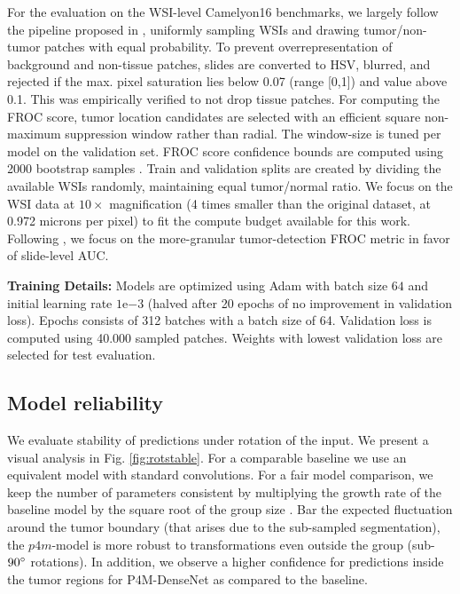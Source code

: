 \documentclass{llncs}
\newcommand{\citet}[1]{\cite{#1}}
\begin{document}
For the evaluation on the WSI-level Camelyon16 benchmarks, we largely follow the pipeline proposed in \citet{Liu2017-jq}, uniformly sampling WSIs and drawing tumor/non-tumor patches with equal probability. To prevent overrepresentation of background  and non-tissue patches, slides are converted to HSV, blurred, and rejected if the max. pixel saturation lies below 0.07 (range [0,1]) and value above 0.1. This was empirically verified to not drop tissue patches. For computing the FROC score, tumor location candidates are selected with an efficient square non-maximum suppression window rather than radial. The window-size is tuned per model on the validation set. FROC score confidence bounds are computed using 2000 bootstrap samples \citet{Liu2017-jq}. Train and validation splits are created by dividing the available WSIs randomly, maintaining equal tumor/normal ratio. We focus on the WSI data at $10\times$  magnification (4 times smaller than the original dataset, at 0.972 microns per pixel) to fit the compute budget available for this work. Following \cite{Liu2017-jq}, we focus on the more-granular tumor-detection FROC metric in favor of slide-level AUC.






\textbf{Training Details:} Models are optimized using Adam\cite{Kingma2014-ll} with batch size $64$ and initial learning rate $1\mathrm{e}{-3}$ (halved after 20 epochs of no improvement in validation loss). Epochs consists of 312 batches with a batch size of 64. Validation loss is computed using 40.000 sampled patches. Weights with lowest validation loss are selected for test evaluation. 
















\subsection{Model reliability}
We evaluate stability of predictions under rotation of the input. We present a visual analysis in Fig. \ref{fig:rotstable}. For a comparable baseline we use an equivalent model with standard convolutions. For a fair model comparison, we keep the number of parameters consistent by multiplying the growth rate of the baseline model by the square root of the group size \cite{Cohen2016-do}. 
Bar the expected fluctuation around the tumor boundary (that arises due to the sub-sampled segmentation), the $p4m$-model is more robust to transformations even outside the group (sub-$90\degree$ rotations). In addition, we observe a higher confidence for predictions inside the tumor regions for P4M-DenseNet as compared to the baseline.
\end{document}
